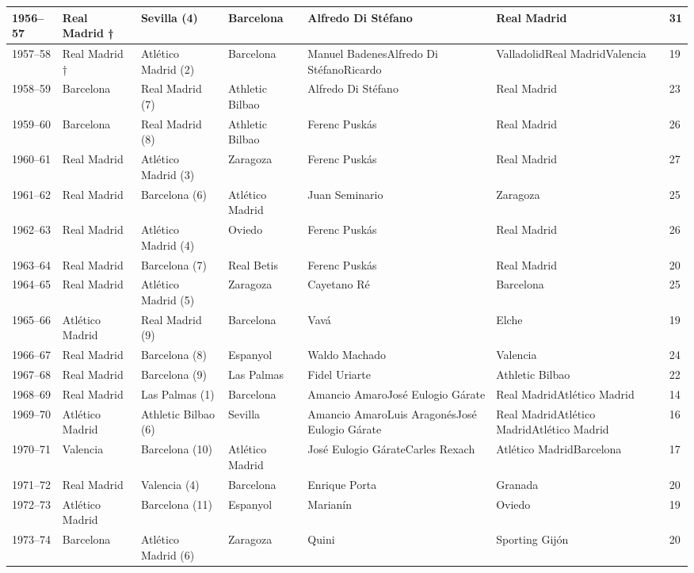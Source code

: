 \documentclass[]{tufte-handout}
\begin{document}
\begin{table}
\begin{tabular}{l|l|l|l|l|l|l}
\hline
1956–57 & Real Madrid  † & Sevilla (4) & Barcelona & Alfredo Di Stéfano & Real Madrid & 31\\
\hline
1957–58 & Real Madrid  † & Atlético Madrid (2) & Barcelona & Manuel BadenesAlfredo Di StéfanoRicardo & ValladolidReal MadridValencia & 19\\
\hline
1958–59 & Barcelona & Real Madrid (7) & Athletic Bilbao & Alfredo Di Stéfano & Real Madrid & 23\\
\hline
1959–60 & Barcelona & Real Madrid (8) & Athletic Bilbao & Ferenc Puskás & Real Madrid & 26\\
\hline
1960–61 & Real Madrid & Atlético Madrid (3) & Zaragoza & Ferenc Puskás & Real Madrid & 27\\
\hline
1961–62 & Real Madrid & Barcelona (6) & Atlético Madrid & Juan Seminario & Zaragoza & 25\\
\hline
1962–63 & Real Madrid & Atlético Madrid (4) & Oviedo & Ferenc Puskás & Real Madrid & 26\\
\hline
1963–64 & Real Madrid & Barcelona (7) & Real Betis & Ferenc Puskás & Real Madrid & 20\\
\hline
1964–65 & Real Madrid & Atlético Madrid (5) & Zaragoza & Cayetano Ré & Barcelona & 25\\
\hline
1965–66 & Atlético Madrid & Real Madrid (9) & Barcelona & Vavá & Elche & 19\\
\hline
1966–67 & Real Madrid & Barcelona (8) & Espanyol & Waldo Machado & Valencia & 24\\
\hline
1967–68 & Real Madrid & Barcelona (9) & Las Palmas & Fidel Uriarte & Athletic Bilbao & 22\\
\hline
1968–69 & Real Madrid & Las Palmas (1) & Barcelona & Amancio AmaroJosé Eulogio Gárate & Real MadridAtlético Madrid & 14\\
\hline
1969–70 & Atlético Madrid & Athletic Bilbao (6) & Sevilla & Amancio AmaroLuis AragonésJosé Eulogio Gárate & Real MadridAtlético MadridAtlético Madrid & 16\\
\hline
1970–71 & Valencia & Barcelona (10) & Atlético Madrid & José Eulogio GárateCarles Rexach & Atlético MadridBarcelona & 17\\
\hline
1971–72 & Real Madrid & Valencia (4) & Barcelona & Enrique Porta & Granada & 20\\
\hline
1972–73 & Atlético Madrid & Barcelona (11) & Espanyol & Marianín & Oviedo & 19\\
\hline
1973–74 & Barcelona & Atlético Madrid (6) & Zaragoza & Quini & Sporting Gijón & 20\\

\end{tabular}
\end{table}
\end{document}
